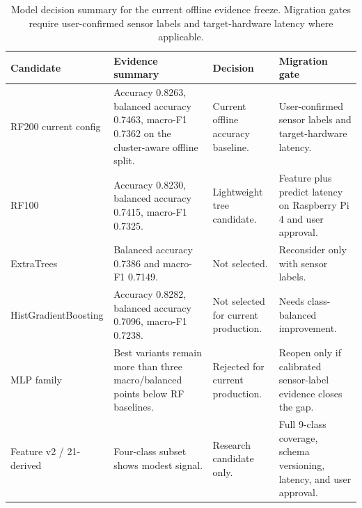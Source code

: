 \begin{table}[!htbp]
\centering
\footnotesize
\caption{Model decision summary for the current offline evidence freeze. Migration gates require user-confirmed sensor labels and target-hardware latency where applicable.}
\label{tab:ch6-ml-model-decisions}
\begin{tabularx}{\textwidth}{@{}lXXX@{}}
\hline
\textbf{Candidate} & \textbf{Evidence summary} & \textbf{Decision} & \textbf{Migration gate} \\
\hline
RF200 current config & Accuracy 0.8263, balanced accuracy 0.7463, macro-F1 0.7362 on the cluster-aware offline split. & Current offline accuracy baseline. & User-confirmed sensor labels and target-hardware latency. \\
RF100 & Accuracy 0.8230, balanced accuracy 0.7415, macro-F1 0.7325. & Lightweight tree candidate. & Feature plus predict latency on Raspberry Pi 4 and user approval. \\
ExtraTrees & Balanced accuracy 0.7386 and macro-F1 0.7149. & Not selected. & Reconsider only with sensor labels. \\
HistGradientBoosting & Accuracy 0.8282, balanced accuracy 0.7096, macro-F1 0.7238. & Not selected for current production. & Needs class-balanced improvement. \\
MLP family & Best variants remain more than three macro/balanced points below RF baselines. & Rejected for current production. & Reopen only if calibrated sensor-label evidence closes the gap. \\
Feature v2 / 21-derived & Four-class subset shows modest signal. & Research candidate only. & Full 9-class coverage, schema versioning, latency, and user approval. \\
\hline
\end{tabularx}
\end{table}

